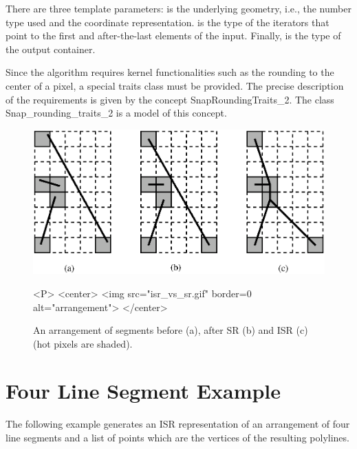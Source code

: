 There are three template parameters:  is the underlying geometry, i.e., the number type used
and the coordinate representation.  is the type of the iterators that point to the first
and after-the-last elements of the input. Finally,  is the type of the output container.

Since the algorithm requires kernel functionalities such as the rounding to the center of a pixel, a special
traits class must be provided. The precise description of the requirements is given by the
concept SnapRoundingTraits\_2. The class Snap\_rounding\_traits\_2 is a model of this concept.

\begin{figure}
\begin{ccTexOnly}
\centerline{\includegraphics{Snap_rounding_2/isr_vs_sr.ps}}
\end{ccTexOnly}

\caption{An arrangement of segments before (a), after SR (b)
and ISR (c) (hot pixels are shaded).}
\label{fig:isr_vs_sr}

\begin{ccHtmlOnly}
<P>
<center>
  <img src="isr_vs_sr.gif"  border=0 alt="arrangement">
</center>
\end{ccHtmlOnly}
\end{figure}


\section{Four Line Segment Example}

The following example generates an ISR representation
of an arrangement of four line segments
and a list of points which are the vertices of the resulting polylines.








